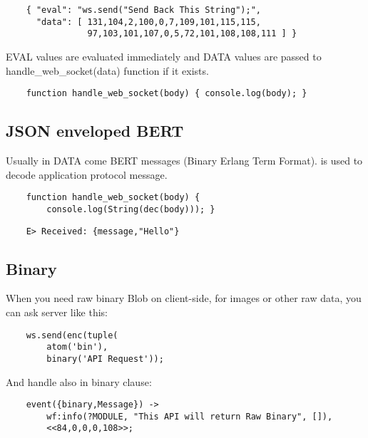 \begin{lstlisting}
    { "eval": "ws.send("Send Back This String");",
      "data": [ 131,104,2,100,0,7,109,101,115,115,
                97,103,101,107,0,5,72,101,108,108,111 ] }
\end{lstlisting}

EVAL values are evaluated immediately and DATA values are passed
to handle\_web\_socket(data) function if it exists.

\begin{lstlisting}
    function handle_web_socket(body) { console.log(body); }
\end{lstlisting}

\subsection*{JSON enveloped BERT}

Usually in DATA come BERT messages (Binary Erlang Term Format).
is used to decode application protocol message.

\begin{lstlisting}
    function handle_web_socket(body) {
        console.log(String(dec(body))); }
\end{lstlisting}

\begin{lstlisting}
    E> Received: {message,"Hello"}
\end{lstlisting}

\subsection{Binary}

When you need raw binary Blob on client-side,
for images or other raw data, you can ask server like this:

\vspace{1\baselineskip}
\begin{lstlisting}
    ws.send(enc(tuple(
        atom('bin'),
        binary('API Request'));
\end{lstlisting}
\vspace{1\baselineskip}

And handle also in binary clause:

\vspace{1\baselineskip}
\begin{lstlisting}
    event({binary,Message}) ->
        wf:info(?MODULE, "This API will return Raw Binary", []),
        <<84,0,0,0,108>>;
\end{lstlisting}
\vspace{1\baselineskip}

